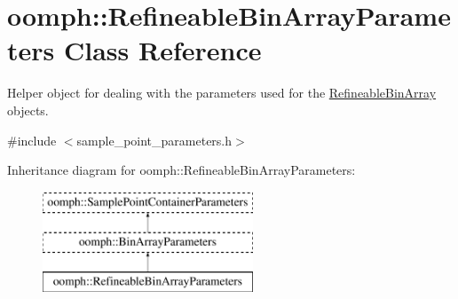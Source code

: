 \hypertarget{classoomph_1_1RefineableBinArrayParameters}{}\section{oomph\+:\+:Refineable\+Bin\+Array\+Parameters Class Reference}
\label{classoomph_1_1RefineableBinArrayParameters}


Helper object for dealing with the parameters used for the \hyperlink{classRefineableBinArray}{Refineable\+Bin\+Array} objects.  




{\ttfamily \#include $<$sample\+\_\+point\+\_\+parameters.\+h$>$}

Inheritance diagram for oomph\+:\+:Refineable\+Bin\+Array\+Parameters\+:\begin{figure}[H]
\begin{center}
\leavevmode
\includegraphics[height=3.000000cm]{classoomph_1_1RefineableBinArrayParameters}
\end{center}
\end{figure}
